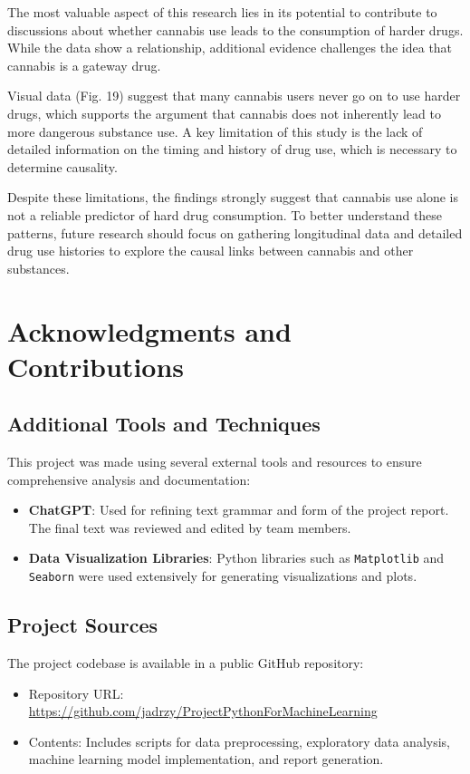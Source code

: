 \documentclass{article}
\begin{document}
The most valuable aspect of this research lies in its potential to contribute to discussions about whether cannabis use leads to the consumption of harder drugs. While the data show a relationship, additional evidence challenges the idea that cannabis is a gateway drug.

Visual data (Fig. 19) suggest that many cannabis users never go on to use harder drugs, which supports the argument that cannabis does not inherently lead to more dangerous substance use. A key limitation of this study is the lack of detailed information on the timing and history of drug use, which is necessary to determine causality.

\hspace{1cm}Despite these limitations, the findings strongly suggest that cannabis use alone is not a reliable predictor of hard drug consumption. To better understand these patterns, future research should focus on gathering longitudinal data and detailed drug use histories to explore the causal links between cannabis and other substances.


\section{Acknowledgments and Contributions}



\subsection{Additional Tools and Techniques}
This project was made using several external tools and resources to ensure comprehensive analysis and documentation:
\begin{itemize}
    \item \textbf{ChatGPT}: Used for refining text grammar and form of the project report. The final text was reviewed and edited by team members.
    \item \textbf{Data Visualization Libraries}: Python libraries such as \texttt{Matplotlib} and \texttt{Seaborn} were used extensively for generating visualizations and plots.
\end{itemize}
\newpage
\subsection{Project Sources}
The project codebase is available in a public GitHub repository:
\begin{itemize}
    \item Repository URL: \url{https://github.com/jadrzy/ProjectPythonForMachineLearning}
    \item Contents: Includes scripts for data preprocessing, exploratory data analysis, machine learning model implementation, and report generation.
\end{itemize}
\end{document}
